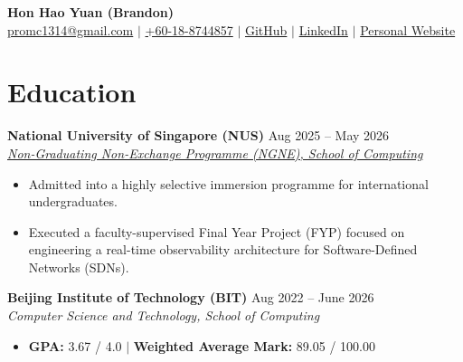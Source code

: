 \documentclass[10pt, letterpaper]{article}
\begin{document}
\begin{center}
    {\Huge \textbf{Hon Hao Yuan (Brandon)}} \\ \vspace{6pt}
    \href{mailto:promc1314@gmail.com}{promc1314@gmail.com} $|$
    \href{tel:+60188744857}{+60-18-8744857} $|$
    \href{https://github.com/honhaoyuan0}{GitHub} $|$
    \href{https://www.linkedin.com/in/hao-yuan-hon-699524242/}{LinkedIn} $|$
    \href{https://honhaoyuan0.github.io}{Personal Website}
\end{center}
\vspace{2ex}

\section{Education}

\textbf{National University of Singapore (NUS)} \hfill Aug 2025 -- May 2026 \\
\href{https://www.comp.nus.edu.sg/~ngne/}{\textit{Non-Graduating Non-Exchange Programme (NGNE), School of Computing}}
\begin{itemize}[leftmargin=0.2in, itemsep=4pt, parsep=2pt, topsep=4pt]
    \item Admitted into a highly selective immersion programme for international undergraduates.
    \item Executed a faculty-supervised Final Year Project (FYP) focused on engineering a real-time observability architecture for Software-Defined Networks (SDNs).
\end{itemize}
\vspace{8pt}

\textbf{Beijing Institute of Technology (BIT)} \hfill Aug 2022 -- June 2026 \\
\textit{Computer Science and Technology, School of Computing}
\begin{itemize}[leftmargin=0.2in, itemsep=4pt, parsep=2pt, topsep=4pt]
    \item \textbf{GPA:} 3.67 / 4.0 $|$ \textbf{Weighted Average Mark:} 89.05 / 100.00
\end{itemize}

\end{document}
